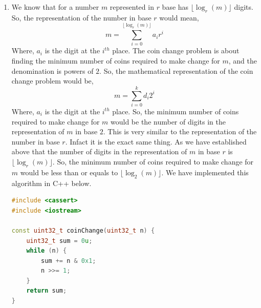 \documentclass[addpoints,a4paper]{exam}
\begin{document}
\begin{questions}
	
	\begin{solution}
		\begin{enumerate}
			\item We know that for a number \(m\) represented in \(r\) base has \(\lfloor\log_{r}(m)\rfloor\) digits. So, the representation of the number in base \(r\) would mean,
			      \[m=\sum_{i=0}^{\lfloor\log_{r}(m)\rfloor}a_ir^i\]
			      Where, \(a_i\) is the digit at the \(i^{th}\) place. The coin change problem is about finding the minimum number of coins required to make change for \(m\), and the denomination is powers of \(2\). So, the mathematical representation of the coin change problem would be,
			      \[m=\sum_{i=0}^{k}d_i2^i\]
			      Where, \(a_i\) is the digit at the \(i^{th}\) place. So, the minimum number of coins required to make change for \(m\) would be the number of digits in the representation of \(m\) in base \(2\). This is very similar to the representation of the number in base \(r\). Infact it is the exact same thing. As we have established above that the number of digits in the representation of \(m\) in base \(r\) is \(\lfloor\log_{r}(m)\rfloor\). So, the minimum number of coins required to make change for \(m\) would be less than or equals to \(\lfloor\log_{2}(m)\rfloor\). We have implemented this algorithm in C++ below.
			      \begin{lstlisting}[language=cpp]
#include <cassert>
#include <iostream>

const uint32_t coinChange(uint32_t n) {
	uint32_t sum = 0u;
	while (n) {
		sum += n & 0x1;
		n >>= 1;
	}
	return sum;
}


\end{lstlisting}
\end{enumerate}
\end{solution}
\end{questions}
\end{document}
